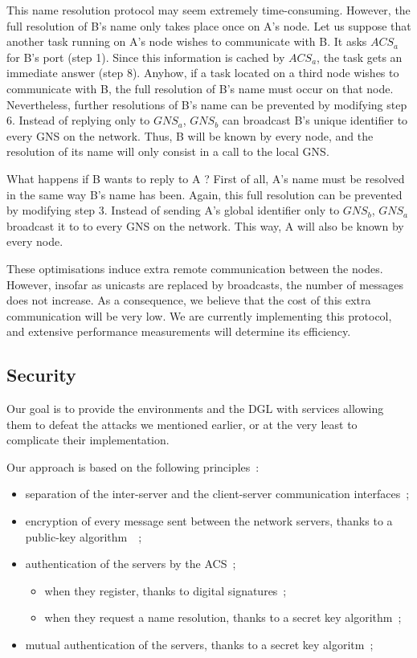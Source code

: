 This name resolution protocol may seem extremely time-consuming. However, the 
full resolution of B's name only takes place once on A's node. Let us suppose 
that another task running on A's node wishes to communicate with B. It asks 
\(ACS_{a}\) for B's port (step 1). Since this information is cached by \(ACS_{a}\),
 the task gets an immediate answer (step 8).
Anyhow, if a task located on a third node wishes to communicate with B, 
the full resolution of B's name must occur on that node. 
Nevertheless, further resolutions of B's name can be prevented by modifying 
step 6. 
Instead of replying only to \(GNS_{a}\), \(GNS_{b}\) can broadcast B's unique 
identifier to every GNS on the network. Thus, B will be known by every node, 
and the resolution of its name will only consist in a call to 
the local GNS.

What happens if B wants to reply to A ? First of all, A's name must be 
resolved in the same way B's name has been. Again, this full resolution can
be prevented by modifying step 3. Instead of sending A's global 
identifier only to \(GNS_{b}\), \(GNS_{a}\) broadcast it to to every GNS on the network. This way, A will also be known by every node.

These optimisations induce extra remote communication between the nodes.
However, insofar as unicasts are replaced by broadcasts, the number of messages
does not increase. As a consequence, we believe that the cost of this extra 
communication will be very low. We are currently implementing this protocol, 
and extensive performance measurements will determine its efficiency.

\subsection{Security}

Our goal is to provide the environments and the DGL with services allowing 
them to defeat the attacks we mentioned earlier, or at the very least to 
complicate their implementation.

Our approach is based on the following principles~:
\begin{itemize}
\item separation of the inter-server and the client-server communication 
interfaces~;
\item encryption of every message sent between the network servers, thanks to
a public-key algorithm~\cite{Diffie76}~;
\item authentication of the servers by the ACS~;
	\begin{itemize}
	\item when they register, thanks to digital signatures~;
	\item when they request a name resolution, thanks to a secret key 
algorithm~;
	\end{itemize}
\item mutual authentication of the servers, thanks to a secret key algoritm~;
\end{itemize}

